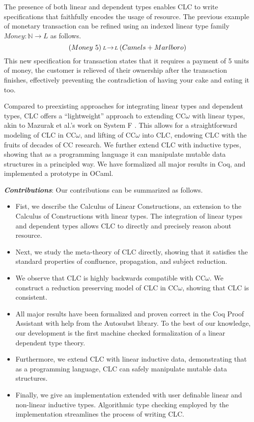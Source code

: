 \documentclass{article}
\theoremstyle{definition}
\newcommand{\arw}[2]
{\hspace*{0.2em}{\scriptstyle #1}\hspace*{-0.2em}
\rightarrow
\hspace*{-0.2em}{\scriptstyle #2}\hspace*{0.2em}}
\begin{document}
  The presence of both linear and dependent types enables CLC to write specifications that faithfully encodes the usage of resource. The previous example of monetary transaction can be refined using an indexed linear type family $Money : \mathbb{N} \rightarrow L$ as follows.
  \begin{equation*}
    (Money\ 5) \arw{L}{L} (Camels + Marlboro)
  \end{equation*}
  This new specification for transaction states that it requires a payment of 5 units of money, the customer is relieved of their ownership after the transaction finishes, effectively preventing the contradiction of having your cake and eating it too.

  Compared to preexisting approaches for integrating linear types and dependent types, CLC offers a ``lightweight'' approach to extending CC$\omega$ with linear types, akin to Mazurak et al.'s work on System F \cite{mazurak}. This allows for a straightforward modeling of CLC in CC$\omega$, and lifting of CC$\omega$ into CLC, endowing CLC with the fruits of decades of CC research. We further extend CLC with inductive types, showing that as a programming language it can manipulate mutable data structures in a principled way. We have formalized all major results in Coq, and implemented a prototype in OCaml. 

  \medskip

  \noindent \textbf{\textit{Contributions}}: 
  Our contributions can be summarized as follows.
  \begin{itemize}
    \item Fist, we describe the Calculus of Linear Constructions, an extension to the Calculus of Constructions with linear types. The integration of linear types and dependent types allows CLC to directly and precisely reason about resource.
    \item Next, we study the meta-theory of CLC directly, showing that it satisfies the standard properties of confluence, propagation, and subject reduction. 
    \item We observe that CLC is highly backwards compatible with CC$\omega$. We construct a reduction preserving model of CLC in CC$\omega$, showing that CLC is consistent. 
    \item All major results have been formalized and proven correct in the Coq Proof Assistant with help from the Autosubst \cite{autosubst} library. To the best of our knowledge, our development is the first machine checked formalization of a linear dependent type theory.
    \item Furthermore, we extend CLC with linear inductive data, demonstrating that as a programming language, CLC can safely manipulate mutable data structures.
    \item Finally, we give an implementation extended with user definable linear and non-linear inductive types. Algorithmic type checking employed by the implementation streamlines the process of writing CLC.
  \end{itemize}
\end{document}
